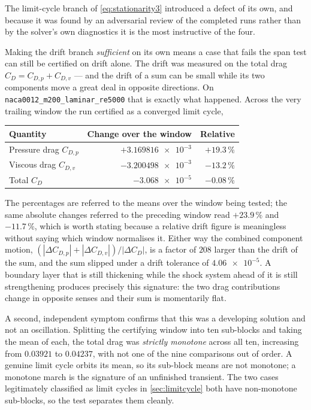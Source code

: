 The limit-cycle branch of \cref{eq:stationarity3} introduced a defect of its own,
and because it was found by an adversarial review of the completed runs rather than
by the solver's own diagnostics it is the most instructive of the four.

Making the drift branch \emph{sufficient} on its own means a case that fails the
span test can still be certified on drift alone. The drift was measured on the
total drag $C_D=C_{D,p}+C_{D,v}$ --- and the drift of a sum can be small while its
two components move a great deal in opposite directions. On
\texttt{naca0012\_m200\_laminar\_re5000} that is exactly what happened. Across the
very trailing window the run certified as a converged limit cycle,

\begin{center}
\begin{tabular}{lrr}
  \toprule
  Quantity & Change over the window & Relative \\
  \midrule
  Pressure drag $C_{D,p}$ & $+\num{3.169816e-3}$ & $+19.3\,\%$ \\
  Viscous drag $C_{D,v}$ & $-\num{3.200498e-3}$ & $-13.2\,\%$ \\
  \midrule
  Total $C_D$ & $-\num{3.068e-5}$ & $-0.08\,\%$ \\
  \bottomrule
\end{tabular}
\end{center}

\noindent The percentages are referred to the means over the window being tested; the
same absolute changes referred to the preceding window read $+23.9\,\%$ and
$-11.7\,\%$, which is worth stating because a relative drift figure is meaningless
without saying which window normalises it. Either way the combined component motion,
$(|\Delta C_{D,p}|+|\Delta C_{D,v}|)/|\Delta C_D|$, is a factor of $208$ larger than the
drift of the sum, and the sum slipped under a drift tolerance of $\num{4.06e-5}$. A
boundary layer that is still thickening while the shock system ahead of it is still
strengthening produces precisely this signature: the two drag contributions change in
opposite senses and their sum is momentarily flat.

A second, independent symptom confirms that this was a developing solution and not
an oscillation. Splitting the certifying window into ten sub-blocks and taking the
mean of each, the total drag was \emph{strictly monotone} across all ten,
increasing from $\num{0.03921}$ to $\num{0.04237}$, with not one of the nine
comparisons out of order. A genuine limit cycle orbits its
mean, so its sub-block means are not monotone; a monotone march is the signature of
an unfinished transient. The two cases legitimately classified as limit cycles in
\cref{sec:limitcycle} both have non-monotone sub-blocks, so the test separates them
cleanly.

